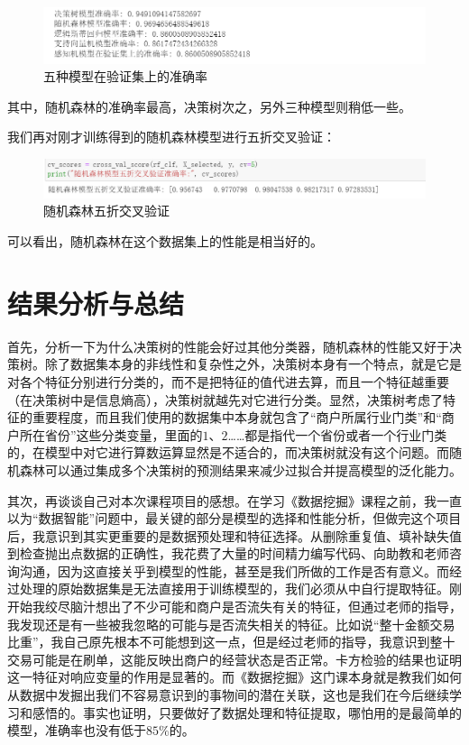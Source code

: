 \documentclass{article}
\begin{document}
\begin{figure}[h]
    \centering
    \includegraphics[width=0.75\linewidth]{img/image04.png}
    \caption{五种模型在验证集上的准确率}
    \label{fig:enter-label}
\end{figure}

其中，随机森林的准确率最高，决策树次之，另外三种模型则稍低一些。

我们再对刚才训练得到的随机森林模型进行五折交叉验证：
\begin{figure}[h]
    \centering
    \includegraphics[width=0.75\linewidth]{img/image05.png}
    \caption{随机森林五折交叉验证}
    \label{fig:enter-label}
\end{figure}

可以看出，随机森林在这个数据集上的性能是相当好的。

\section{结果分析与总结}
首先，分析一下为什么决策树的性能会好过其他分类器，随机森林的性能又好于决策树。除了数据集本身的非线性和复杂性之外，决策树本身有一个特点，就是它是对各个特征分别进行分类的，而不是把特征的值代进去算，而且一个特征越重要（在决策树中是信息熵高），决策树就越先对它进行分类。显然，决策树考虑了特征的重要程度，而且我们使用的数据集中本身就包含了“商户所属行业门类”和“商户所在省份”这些分类变量，里面的$1$、$2$……都是指代一个省份或者一个行业门类的，在模型中对它进行算数运算显然是不适合的，而决策树就没有这个问题。而随机森林可以通过集成多个决策树的预测结果来减少过拟合并提高模型的泛化能力。

其次，再谈谈自己对本次课程项目的感想。在学习《数据挖掘》课程之前，我一直以为“数据智能”问题中，最关键的部分是模型的选择和性能分析，但做完这个项目后，我意识到其实更重要的是数据预处理和特征选择。从删除重复值、填补缺失值到检查抛出点数据的正确性，我花费了大量的时间精力编写代码、向助教和老师咨询沟通，因为这直接关乎到模型的性能，甚至是我们所做的工作是否有意义。而经过处理的原始数据集是无法直接用于训练模型的，我们必须从中自行提取特征。刚开始我绞尽脑汁想出了不少可能和商户是否流失有关的特征，但通过老师的指导，我发现还是有一些被我忽略的可能与是否流失相关的特征。比如说“整十金额交易比重”，我自己原先根本不可能想到这一点，但是经过老师的指导，我意识到整十交易可能是在刷单，这能反映出商户的经营状态是否正常。卡方检验的结果也证明这一特征对响应变量的作用是显著的。而《数据挖掘》这门课本身就是教我们如何从数据中发掘出我们不容易意识到的事物间的潜在关联，这也是我们在今后继续学习和感悟的。事实也证明，只要做好了数据处理和特征提取，哪怕用的是最简单的模型，准确率也没有低于$85\%$的。
\end{document}
